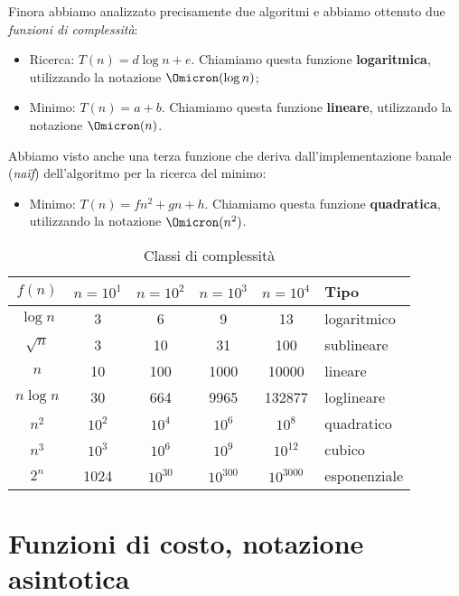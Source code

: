 Finora abbiamo analizzato precisamente due algoritmi e abbiamo ottenuto due \emph{funzioni di complessità}:
\begin{itemize}
	\item Ricerca: \(T(n) = d \log n + e\). Chiamiamo questa funzione \textbf{logaritmica}, utilizzando la notazione \(\Omicron(\log n)\);
	\item Minimo: \(T(n) = a + b\). Chiamiamo questa funzione \textbf{lineare}, utilizzando la notazione \(\Omicron(n)\).
\end{itemize}
Abbiamo visto anche una terza funzione che deriva dall'implementazione banale (\emph{na\"{i}f}) dell'algoritmo per la ricerca del minimo:
\begin{itemize}
	\item Minimo: \(T(n) = fn^2 + gn + h\). Chiamiamo questa funzione \textbf{quadratica}, utilizzando la notazione \(\Omicron(n^2)\).
\end{itemize}


\begin{table}[hb]
	\centering
	\caption[Classi di complessità degli algoritmi]{Classi di complessità}
	\label{tab:classi-complessita}
	\begin{tabular}{@{} c *{4}{S[table-format=4]} l @{}}
	\toprule
		\(f(n)\) & \(n = 10^1\) & \(n = 10^2\) & \(n = 10^3\) & \(n = 10^4\) & Tipo \\
	\midrule
		\(\log n\) & 3 & 6 & 9 & 13 & logaritmico \\
	\lightrule
		\(\sqrt{n}\) & 3 & 10 & 31 & 100 & sublineare \\
	\lightrule
		\(n\) & 10 & 100 & 1000 & 10000 & lineare \\
	\lightrule
		\(n \log n\) & 30 & 664 & 9965 & 132877 & loglineare \\
	\lightrule
		\(n^2\) & \(10^2\) & \(10^4\) & \(10^6\) & \(10^8\)& quadratico \\
	\lightrule
		\(n^3\) & \(10^3\) & \(10^6\) & \(10^9\) & \(10^{12}\) & cubico \\
	\lightrule
		\(2^n\) & 1024 & \(10^{30}\) & \(10^{300}\) & \(10^{3000}\) & esponenziale \\
	\bottomrule
	\end{tabular}
\end{table}

\section{Funzioni di costo, notazione asintotica}

